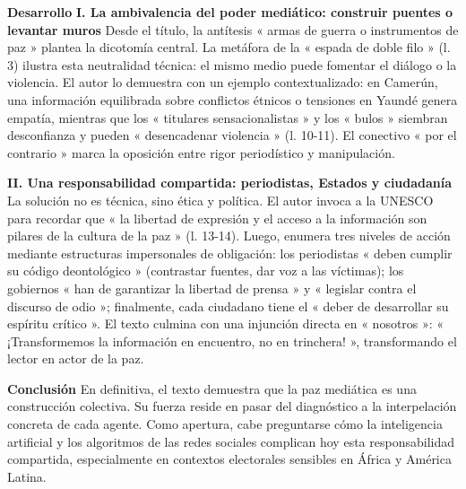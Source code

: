 \documentclass[11pt]{article}
\begin{document}
\begin{exoresolu}
\begin{textebox}
\textbf{Desarrollo}
\textbf{I. La ambivalencia del poder mediático: construir puentes o levantar muros}
Desde el título, la antítesis « armas de guerra o instrumentos de paz » plantea la dicotomía central. La metáfora de la « espada de doble filo » (l. 3) ilustra esta neutralidad técnica: el mismo medio puede fomentar el diálogo o la violencia. El autor lo demuestra con un ejemplo contextualizado: en Camerún, una información equilibrada sobre conflictos étnicos o tensiones en Yaundé genera empatía, mientras que los « titulares sensacionalistas » y los « bulos » siembran desconfianza y pueden « desencadenar violencia » (l. 10-11). El conectivo « por el contrario » marca la oposición entre rigor periodístico y manipulación.

\textbf{II. Una responsabilidad compartida: periodistas, Estados y ciudadanía}
La solución no es técnica, sino ética y política. El autor invoca a la UNESCO para recordar que « la libertad de expresión y el acceso a la información son pilares de la cultura de la paz » (l. 13-14). Luego, enumera tres niveles de acción mediante estructuras impersonales de obligación: los periodistas « deben cumplir su código deontológico » (contrastar fuentes, dar voz a las víctimas); los gobiernos « han de garantizar la libertad de prensa » y « legislar contra el discurso de odio »; finalmente, cada ciudadano tiene el « deber de desarrollar su espíritu crítico ». El texto culmina con una injunción directa en « nosotros »: « ¡Transformemos la información en encuentro, no en trinchera! », transformando el lector en actor de la paz.

\textbf{Conclusión}
En definitiva, el texto demuestra que la paz mediática es una construcción colectiva. Su fuerza reside en pasar del diagnóstico a la interpelación concreta de cada agente. Como apertura, cabe preguntarse cómo la inteligencia artificial y los algoritmos de las redes sociales complican hoy esta responsabilidad compartida, especialmente en contextos electorales sensibles en África y América Latina.
\end{textebox}


\end{exoresolu}
\end{document}
